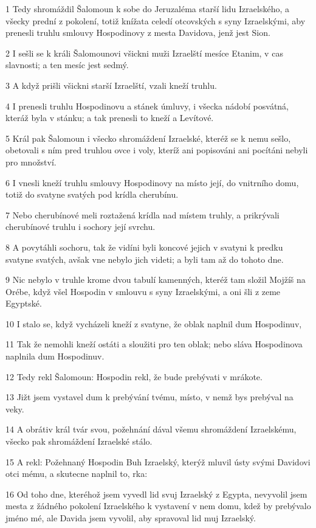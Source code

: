 \par 1 Tedy shromáždil Šalomoun k sobe do Jeruzaléma starší lidu Izraelského, a všecky prední z pokolení, totiž knížata celedí otcovských s syny Izraelskými, aby prenesli truhlu smlouvy Hospodinovy z mesta Davidova, jenž jest Sion.
\par 2 I sešli se k králi Šalomounovi všickni muži Izraelští mesíce Etanim, v cas slavnosti; a ten mesíc jest sedmý.
\par 3 A když prišli všickni starší Izraelští, vzali kneží truhlu.
\par 4 I prenesli truhlu Hospodinovu a stánek úmluvy, i všecka nádobí posvátná, kteráž byla v stánku; a tak prenesli to kneží a Levítové.
\par 5 Král pak Šalomoun i všecko shromáždení Izraelské, kteréž se k nemu sešlo, obetovali s ním pred truhlou ovce i voly, kteríž ani popisováni ani pocítáni nebyli pro množství.
\par 6 I vnesli kneží truhlu smlouvy Hospodinovy na místo její, do vnitrního domu, totiž do svatyne svatých pod krídla cherubínu.
\par 7 Nebo cherubínové meli roztažená krídla nad místem truhly, a prikrývali cherubínové truhlu i sochory její svrchu.
\par 8 A povytáhli sochoru, tak že vidíni byli koncové jejich v svatyni k predku svatyne svatých, avšak vne nebylo jich videti; a byli tam až do tohoto dne.
\par 9 Nic nebylo v truhle krome dvou tabulí kamenných, kteréž tam složil Mojžíš na Orébe, když všel Hospodin v smlouvu s syny Izraelskými, a oni šli z zeme Egyptské.
\par 10 I stalo se, když vycházeli kneží z svatyne, že oblak naplnil dum Hospodinuv,
\par 11 Tak že nemohli kneží ostáti a sloužiti pro ten oblak; nebo sláva Hospodinova naplnila dum Hospodinuv.
\par 12 Tedy rekl Šalomoun: Hospodin rekl, že bude prebývati v mrákote.
\par 13 Jižt jsem vystavel dum k prebývání tvému, místo, v nemž bys prebýval na veky.
\par 14 A obrátiv král tvár svou, požehnání dával všemu shromáždení Izraelskému, všecko pak shromáždení Izraelské stálo.
\par 15 A rekl: Požehnaný Hospodin Buh Izraelský, kterýž mluvil ústy svými Davidovi otci mému, a skutecne naplnil to, rka:
\par 16 Od toho dne, kteréhož jsem vyvedl lid svuj Izraelský z Egypta, nevyvolil jsem mesta z žádného pokolení Izraelského k vystavení v nem domu, kdež by prebývalo jméno mé, ale Davida jsem vyvolil, aby spravoval lid muj Izraelský.
